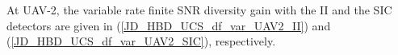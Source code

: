 \begin{proposition}
At UAV-2, the variable rate finite SNR diversity gain with the II and the SIC detectors are given in (\ref{JD_HBD_UCS_df_var_UAV2_II}) and (\ref{JD_HBD_UCS_df_var_UAV2_SIC}), respectively.


\end{proposition}
